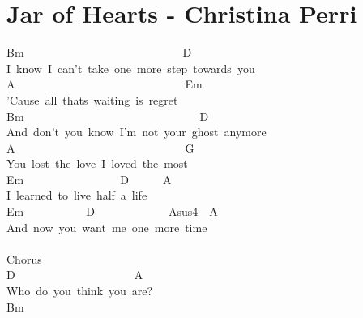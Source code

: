 \documentclass[]{book}
\let\stdsection\section
\renewcommand\section{\clearpage\stdsection}
\begin{document}
\hypertarget{jar-of-hearts---christina-perri}{%
\section{Jar of Hearts - Christina Perri}\label{jar-of-hearts---christina-perri}}

Bm~~~~~~~~~~~~~~~~~~~~~~~~~~~~D\\
I~know~I~can't~take~one~more~step~towards~you\\
A~~~~~~~~~~~~~~~~~~~~~~~~~~~~~~Em\\
'Cause~all~thats~waiting~is~regret\\
Bm~~~~~~~~~~~~~~~~~~~~~~~~~~~~~~~D\\
And~don't~you~know~I'm~not~your~ghost~anymore\\
A~~~~~~~~~~~~~~~~~~~~~~~~~~~~~~G\\
You~lost~the~love~I~loved~the~most\\
Em~~~~~~~~~~~~~~~~~D~~~~~~A\\
I~learned~to~live~half~a~life\\
Em~~~~~~~~~~~D~~~~~~~~~~~~~Asus4~~A\\
And~now~you~want~me~one~more~time\\
~\\
Chorus\\
D~~~~~~~~~~~~~~~~~~~~~A\\
Who~do~you~think~you~are?\\
\hspace*{0.333em}\hspace*{0.333em}\hspace*{0.333em}\hspace*{0.333em}\hspace*{0.333em}\hspace*{0.333em}\hspace*{0.333em}\hspace*{0.333em}\hspace*{0.333em}\hspace*{0.333em}\hspace*{0.333em}\hspace*{0.333em}\hspace*{0.333em}\hspace*{0.333em}\hspace*{0.333em}\hspace*{0.333em}\hspace*{0.333em}\hspace*{0.333em}\hspace*{0.333em}\hspace*{0.333em}\hspace*{0.333em}\hspace*{0.333em}\hspace*{0.333em}\hspace*{0.333em}Bm\\
\end{document}
